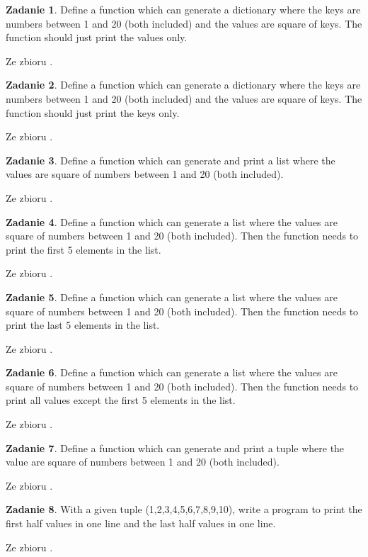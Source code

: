\documentclass[11pt]{article}
\theoremstyle{definition}
\newtheorem{zadanie}{Zadanie}
\newcommand{\fromA}{\small Ze zbioru \cite{python100}.}
\begin{document}
\begin{zadanie}
Define a function which can generate a dictionary where the keys are numbers between 1 and 20 (both included) and the values are square of keys. The function should just print the values only.

\fromA
\end{zadanie}
\begin{zadanie}
Define a function which can generate a dictionary where the keys are numbers between 1 and 20 (both included) and the values are square of keys. The function should just print the keys only.

\fromA
\end{zadanie}
\begin{zadanie}
Define a function which can generate and print a list where the values are square of numbers between 1 and 20 (both included).

\fromA
\end{zadanie}
\begin{zadanie}
Define a function which can generate a list where the values are square of numbers between 1 and 20 (both included). Then the function needs to print the first 5 elements in the list.

\fromA
\end{zadanie}
\begin{zadanie}
Define a function which can generate a list where the values are square of numbers between 1 and 20 (both included). Then the function needs to print the last 5 elements in the list.

\fromA
\end{zadanie}
\begin{zadanie}
Define a function which can generate a list where the values are square of numbers between 1 and 20 (both included). Then the function needs to print all values except the first 5 elements in the list.

\fromA
\end{zadanie}
\begin{zadanie}
Define a function which can generate and print a tuple where the value are square of numbers between 1 and 20 (both included).

\fromA
\end{zadanie}
\begin{zadanie}
With a given tuple (1,2,3,4,5,6,7,8,9,10), write a program to print the first half values in one line and the last half values in one line.

\fromA
\end{zadanie}
\end{document}
